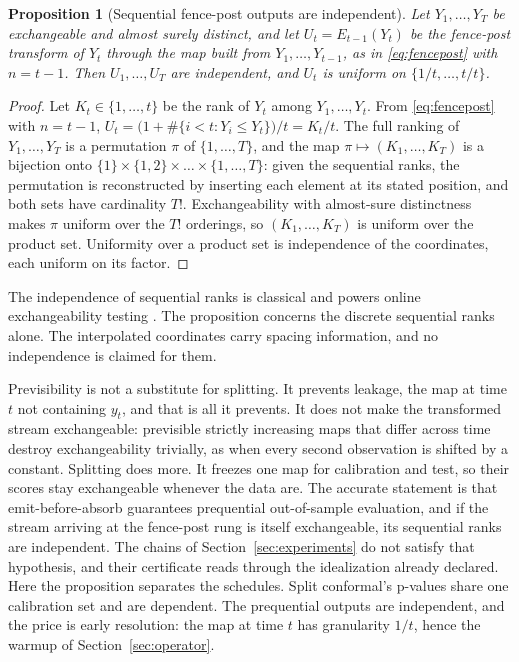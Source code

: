\documentclass[11pt]{article}
\newtheorem{proposition}{Proposition}
\theoremstyle{remark}
\begin{document}
\begin{proposition}[Sequential fence-post outputs are independent]\label{prop:sequential}
Let $Y_1, \dots, Y_T$ be exchangeable and almost surely distinct, and let
$U_t = E_{t-1}(Y_t)$ be the fence-post transform of $Y_t$ through the map built from
$Y_1, \dots, Y_{t-1}$, as in \eqref{eq:fencepost} with $n = t - 1$. Then
$U_1, \dots, U_T$ are independent, and $U_t$ is uniform on $\{1/t, \dots, t/t\}$.
\end{proposition}

\begin{proof}
Let $K_t \in \{1, \dots, t\}$ be the rank of $Y_t$ among $Y_1, \dots, Y_t$. From
\eqref{eq:fencepost} with $n = t-1$,
$U_t = \big(1 + \#\{i < t : Y_i \le Y_t\}\big)/t = K_t / t$. The full ranking of
$Y_1, \dots, Y_T$ is a permutation $\pi$ of $\{1, \dots, T\}$, and the map
$\pi \mapsto (K_1, \dots, K_T)$ is a bijection onto
$\{1\} \times \{1,2\} \times \dots \times \{1, \dots, T\}$: given the sequential ranks,
the permutation is reconstructed by inserting each element at its stated position, and
both sets have cardinality $T!$. Exchangeability with almost-sure distinctness makes
$\pi$ uniform over the $T!$ orderings, so $(K_1, \dots, K_T)$ is uniform over the product
set. Uniformity over a product set is independence of the coordinates, each uniform on
its factor.
\end{proof}

The independence of sequential ranks is classical \citep{renyi1962} and powers online
exchangeability testing \citep{vovk2003testing}. The proposition concerns the discrete
sequential ranks alone. The interpolated coordinates carry spacing information, and no
independence is claimed for them.

Previsibility is not a substitute for splitting. It prevents leakage, the map at
time $t$ not containing $y_t$, and that is all it prevents. It does not make the transformed stream exchangeable: previsible
strictly increasing maps that differ across time destroy exchangeability trivially,
as when every second observation is shifted by a constant. Splitting does more. It
freezes one map for calibration and test, so their scores stay exchangeable whenever
the data are. The accurate statement is that emit-before-absorb guarantees prequential
out-of-sample evaluation, and if the stream arriving at the fence-post rung is itself
exchangeable, its sequential ranks are independent. The chains of
Section~\ref{sec:experiments} do not satisfy that hypothesis, and their certificate
reads through the idealization already declared. Here the proposition separates the
schedules. Split
conformal's p-values share one calibration set and are dependent. The prequential
outputs are independent, and the price is early resolution: the map at time $t$ has
granularity $1/t$, hence the warmup of Section~\ref{sec:operator}.
\end{document}
